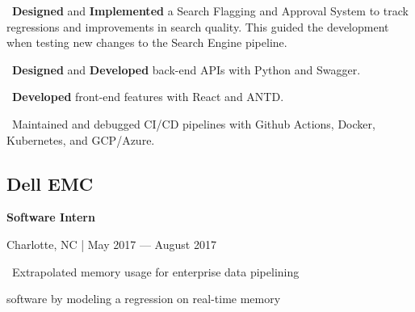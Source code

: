 \documentclass{article}
\begin{document}
\begin{minipage}[t][0pt]{8in\linewidth}
\begin{minipage}[t]{0.45\textwidth\hspace{0in}}
\begin{minipage}[t]{3.75in\textwidth\hspace{0in}}
            \vspace{0.3em}
            \hspace{1em}\textasteriskcentered \, \mdseries\textrm{\textbf{Designed} and \textbf{Implemented} a Search Flagging and Approval System to track regressions and improvements in search quality. This guided the development when testing new changes to the Search Engine pipeline.}

            \vspace{0.3em}
            \hspace{1em}\textasteriskcentered \, \mdseries\textrm{\textbf{Designed} and \textbf{Developed} back-end APIs with Python and Swagger.}

            \vspace{0.3em}
            \hspace{1em}\textasteriskcentered \, \mdseries\textrm{\textbf{Developed} front-end features with React and ANTD.}

            \vspace{0.3em}
            \hspace{1em}\textasteriskcentered \, \mdseries\textrm{Maintained and debugged CI/CD pipelines with Github Actions, Docker, Kubernetes, and GCP/Azure.}
        \end{minipage}

        \vspace{-0.3em}
        \subsection{Dell EMC}
        \vspace{-0.5em}\hspace{0.1em}
        \mdseries\bfseries{Software Intern}
        \vspace{0.1em}
        
        \hspace{0.5em}\mdseries\textrm{Charlotte, NC | May 2017 — August 2017}

        \vspace{-0.4em}
        \begin{minipage}[t]{3.75in\textwidth\hspace{0in}}
            \vspace{0.1em}
            \hspace{1em}\textasteriskcentered \, \mdseries\textrm{Extrapolated memory usage for enterprise data pipelining} 
            
            \hspace{1.6em} software by modeling a regression on real-time memory 
            

\end{minipage}
\end{minipage}
\end{minipage}
\end{document}
